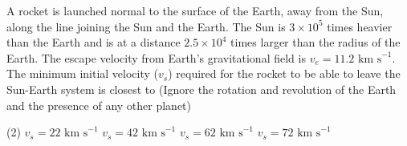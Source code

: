 

    \item A rocket is launched normal to the surface of the Earth, away from the Sun, along the line joining the Sun and the Earth. The Sun is \(3\times10^5\) times heavier than the Earth and is at a distance \(2.5\times10^4\) times larger than the radius of the Earth. The escape velocity from Earth's gravitational field is \(v_e = 11.2 \text{ km s}^{-1}\). The minimum initial velocity (\(v_s\)) required for the rocket to be able to leave the Sun-Earth system is closest to (Ignore the rotation and revolution of the Earth and the presence of any other planet)
    \begin{tasks}(2)
        \task \(v_s = 22 \text{ km s}^{-1}\)
        \task \(v_s = 42 \text{ km s}^{-1}\)
        \task \(v_s = 62 \text{ km s}^{-1}\)
        \task \(v_s = 72 \text{ km s}^{-1}\)
    \end{tasks}

